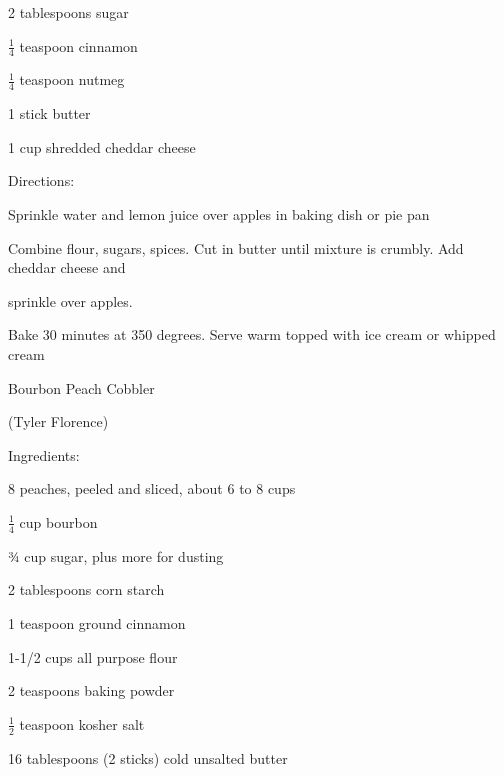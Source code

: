 \documentclass[a4paper,portrait,12pt]{book}
\begin{document}
2 tablespoons sugar




$\frac{1}{4}$ teaspoon cinnamon




$\frac{1}{4}$ teaspoon nutmeg




1 stick butter




1 cup shredded cheddar cheese




Directions:




Sprinkle water and lemon juice over apples in baking dish or pie pan




Combine flour, sugars, spices. Cut in butter until mixture is crumbly. Add cheddar cheese and




sprinkle over apples.




Bake 30 minutes at 350 degrees. Serve warm topped with ice cream or whipped cream







\newpage
Bourbon Peach Cobbler




(Tyler Florence)




Ingredients:




8 peaches, peeled and sliced, about 6 to 8 cups




$\frac{1}{4}$ cup bourbon




¾ cup sugar, plus more for dusting




2 tablespoons corn starch




1 teaspoon ground cinnamon




1-1/2 cups all purpose flour




2 teaspoons baking powder




$\frac{1}{2}$ teaspoon kosher salt




16 tablespoons (2 sticks) cold unsalted butter
\end{document}
